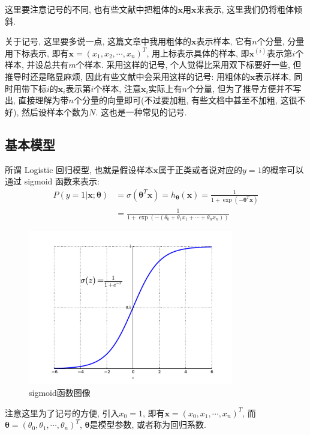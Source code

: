 \documentclass[a4paper,UTF8]{ctexart}
\theoremstyle{plain} \newtheorem{theorem}{定理}[section]
\theoremstyle{plain} \newtheorem{definition}{定义}[section]
\theoremstyle{plain} \newtheorem{lemma}{引理}[section]
\theoremstyle{plain} \newtheorem{proposition}{命题}[section]
\theoremstyle{plain} \newtheorem{example}{例}[section]
\theoremstyle{plain} \newtheorem{remark}{注}[section]
\theoremstyle{plain} \newtheorem{corollary}{推论}[section]
\begin{document}
这里要注意记号的不同, 也有些文献中把粗体的$\bm{x}$用$\mathbf{x}$来表示, 这里我们仍将粗体倾斜.

关于记号, 这里要多说一点, 这篇文章中我用粗体的$\bm{x}$表示样本, 它有$n$个分量, 分量用下标表示, 即有$\bm{x} = (x_{1}, x_{2}, \cdots, x_{n})^{T}$, 用上标表示具体的样本, 即$\bm{x}^{(i)}$表示第$i$个样本, 并设总共有$m$个样本. 采用这样的记号, 个人觉得比采用双下标要好一些, 但推导时还是略显麻烦, 因此有些文献中会采用这样的记号: 用粗体的$\bm{x}$表示样本, 同时用带下标$i$的$\bm{x}_{i}$表示第$i$个样本, 注意$\bm{x}_{i}$实际上有$n$个分量, 但为了推导方便并不写出, 直接理解为带$n$个分量的向量即可(不过要加粗, 有些文档中甚至不加粗, 这很不好), 然后设样本个数为$N$. 这也是一种常见的记号.

\subsection{基本模型}
所谓 Logistic 回归模型, 也就是假设样本$\bm{x}$属于正类或者说对应的$y = 1$的概率可以通过 sigmoid 函数来表示:
\begin{equation}\label{eq:logit-model}
\begin{split}
P(y = 1 | \bm{x}; \bm{\theta}) & = \sigma(\bm{\theta}^{T} \bm{x}) = h_{\bm{\theta}}(\bm{x}) = \frac{1}{1 + \exp(- \bm{\theta}^{T} \bm{x})} \\
& = \frac{1}{1 + \exp(-(\theta_{0} + \theta_{1} x_{1} + \cdots + \theta_{n} x_{n}))}
\end{split}
\end{equation}

\begin{figure}[!htb]
	\centering
	\includegraphics[width=0.80\textwidth]{sigmoid_fig.pdf}
	\caption{sigmoid函数图像}
\end{figure}

注意这里为了记号的方便, 引入$x_{0} = 1$, 即有$\bm{x} = (x_{0}, x_{1}, \cdots, x_{n})^{T}$, 而$\bm{\theta} = (\theta_{0}, \theta_{1}, \cdots, \theta_{n})^{T}$, $\bm{\theta}$是模型参数, 或者称为回归系数.
\end{document}
